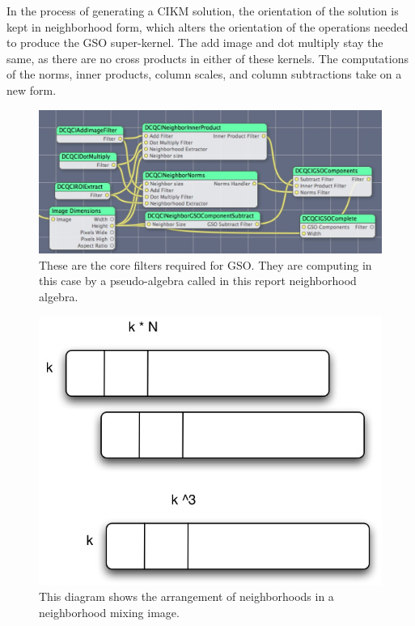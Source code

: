 \documentclass[11pt]{article}
\begin{document}
In the process of generating a CIKM solution, the orientation of the solution is kept in neighborhood form, which alters the orientation of the operations needed to produce the GSO super-kernel.    The add image and dot multiply stay the same, as there are no cross products in either of these kernels.  The computations of the norms, inner products, column scales, and column subtractions take on a new form.  

\begin{figure}[htbp] %
   \centering
   \includegraphics[width=5in]{gso-qc-fundamental-core.jpg} 
   \caption{These are the core filters required for GSO.  They are computing in this case by a pseudo-algebra called in this report neighborhood algebra. }
   \label{qc-gso-fundamental-core}
\end{figure}


\begin{figure}[htbp] %
   \centering
   \includegraphics[width=5in]{neighborhoodArrangement.jpg} 
   \caption{This diagram shows the arrangement of neighborhoods in a neighborhood mixing image. }
   \label{neighborhoodArrangement}
\end{figure}
\end{document}

